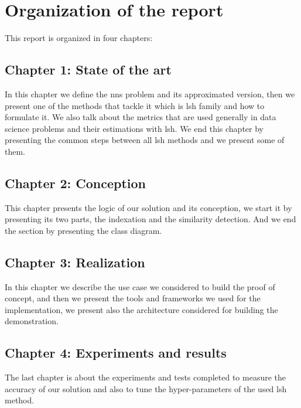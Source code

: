 \section*{Organization of the report}

This report is organized in four chapters:

\subsection*{Chapter 1: State of the art}
In this chapter we define the \acrfull{nns} problem and its approximated
version, then we present one of the methods that tackle it which is
\acrfull{lsh} family and how to formulate it. We also talk about the metrics
that are used generally in data science problems and their estimations with
\acrshort{lsh}. We end this chapter by presenting the common steps between all
\acrshort{lsh} methods and we present some of them.

\subsection*{Chapter 2: Conception}
This chapter presents the logic of our solution and its conception, we start it
by presenting its two parts, the indexation and the similarity detection. And we
end the section by presenting the class diagram.


\subsection*{Chapter 3: Realization}
In this chapter we describe the use case we considered to build the proof of
concept, and then we present the tools and frameworks we used for the
implementation, we present also the architecture considered for building the
demonstration.

\subsection*{Chapter 4: Experiments and results}
The last chapter is about the experiments and tests completed to measure the
accuracy of our solution and also to tune the hyper-parameters of the used
\acrfull{lsh} method. 



